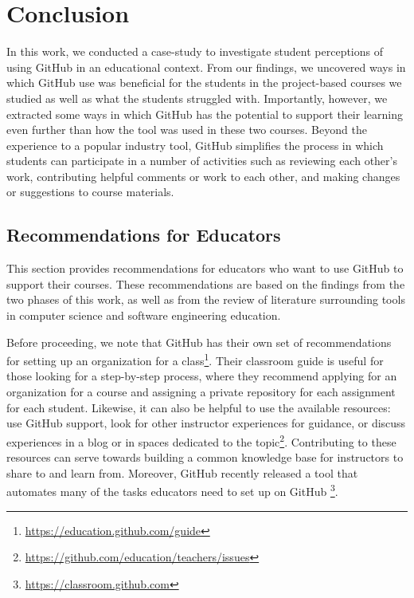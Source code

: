 \section{Conclusion}



In this work, we conducted a case-study to investigate student perceptions of using GitHub in an educational context. From our findings, we uncovered ways in which GitHub use was beneficial for the students in the project-based courses we studied as well as what the students struggled with. Importantly, however, we extracted some ways in which GitHub has the potential to support their learning even further than how the tool was used in these two courses. Beyond the experience to a popular industry tool, GitHub simplifies the process in which students can participate in a number of activities such as reviewing each other's work, contributing helpful comments or work to each other, and making changes or suggestions to course materials.

\subsection{Recommendations for Educators}
This section provides recommendations for educators who want to use GitHub to support their courses. These recommendations are based on the findings from the two phases of this work, as well as from the review of literature surrounding tools in computer science and software engineering education.

Before proceeding, we note that GitHub has their own set of recommendations for setting up an organization for a class\footnote{\url{https://education.github.com/guide}}. Their classroom guide is useful for those looking for a step-by-step process, where they recommend applying for an organization for a course and assigning a private repository for each assignment for each student. Likewise, it can also be helpful to use the available resources: use GitHub support, look for other instructor experiences for guidance, or discuss experiences in a blog or in spaces dedicated to the topic\footnote{\url{https://github.com/education/teachers/issues}}. Contributing to these resources can serve towards building a common knowledge base for instructors to share to and learn from. Moreover, GitHub recently released a tool that automates many of the tasks educators need to set up on GitHub \footnote{\url{https://classroom.github.com}}. \\

